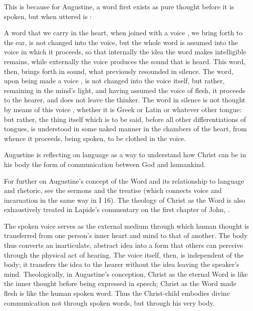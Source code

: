 This is because for Augustine, a word first exists as pure thought before it is
spoken, but when uttered is :
\begin{quoting}
    A word  that we carry in the heart, when
    joined with a voice , we bring
    forth to the ear, is not changed into the voice, but the whole word is
    assumed into the voice in which it proceeds, so that internally the idea the
    word makes intelligible remains, while externally the voice produces the
    sound that is heard.
    This word, then, brings forth in sound, what previously resounded in
    silence.  The word, upon being made a voice , is
    not changed into the voice itself, but rather, remaining in the mind's
    light, and having assumed the voice  of flesh, it proceeds to
    the hearer, and does not leave the thinker.
    The word in silence is not thought by means of this voice ,
    whether it is Greek or Latin or whatever other tongue: but rather, the thing
    itself which is to be said, before all other differentiations of tongues, is
    understood in some naked manner in the chambers of the heart, from whence it
    proceeds, being spoken, to be clothed in the voice.%
    \Autocite[1002, Sermo 187, In Natali Domini 4]{Augustine:SermonesPL}
\end{quoting}
Augustine is reflecting on language as a way to understand how Christ can be in
his body the form of communication between God and humankind.%
\begin{Footnote}
    For further on Augustine's concept of the Word and its relationship to
    language and rhetoric, see the sermons  and the
    treatise  (which connects voice and
    incarnation in the same way in I 16).
    The theology of Christ as the Word is also exhaustively treated in Lapide's
    commentary on the first chapter of John,
    \autocite[872--889]{Lapide:Gospels19C}.
\end{Footnote}

The spoken voice serves as the external medium through which human thought is
transferred from one person's inner heart and mind to that of another.
The body thus converts an inarticulate, abstract idea into a form that others
can perceive through the physical act of hearing.
The voice itself, then, is independent of the body; it transfers the idea to the
hearer without the idea leaving the speaker's mind.
Theologically, in Augustine's conception, Christ as the eternal Word is like the
inner thought before being expressed in speech; Christ as the Word made flesh is
like the human spoken word.
Thus the Christ-child embodies divine communication not through spoken words,
but through his very body.

